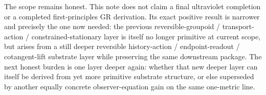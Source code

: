 \documentclass[11pt]{article}
\begin{document}
The scope remains honest. This note does not claim a final ultraviolet completion or a completed first-principles GR derivation. Its exact positive result is narrower and precisely the one now needed: the previous reversible-groupoid / transport-action / constrained-stationary layer is itself no longer primitive at current scope, but arises from a still deeper reversible history-action / endpoint-readout / cotangent-lift substrate layer while preserving the same downstream package. The next honest burden is one layer deeper again: whether that new deeper layer can itself be derived from yet more primitive substrate structure, or else superseded by another equally concrete observer-equation gain on the same one-metric line.
\end{document}
